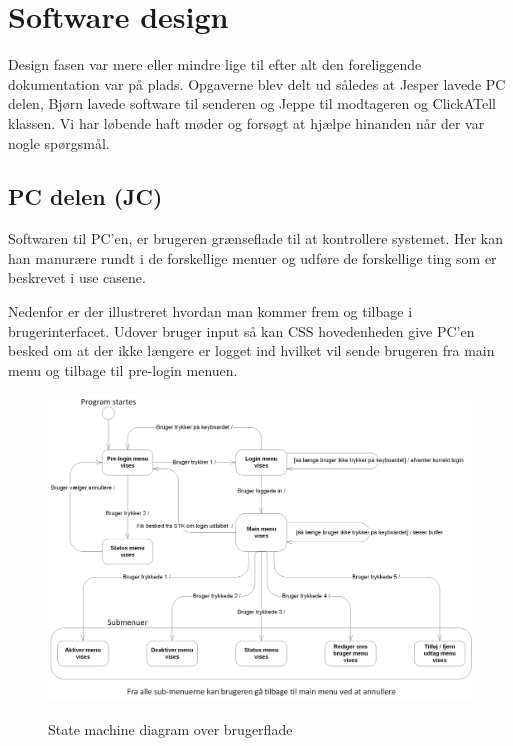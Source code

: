 \clearpage

\section{Software design}

Design fasen var mere eller mindre lige til efter alt den foreliggende dokumentation var på plads. Opgaverne blev delt ud således at Jesper lavede PC delen, Bjørn lavede software til senderen og Jeppe til modtageren og ClickATell klassen. Vi har løbende haft møder og forsøgt at hjælpe hinanden når der var nogle spørgsmål.

\subsection{PC delen (JC)}

Softwaren til PC'en, er brugeren grænseflade til at kontrollere systemet. Her kan han manurære rundt i de forskellige menuer og udføre de forskellige ting som er beskrevet i use casene.

Nedenfor er der illustreret hvordan man kommer frem og tilbage i brugerinterfacet. Udover bruger input så kan CSS hovedenheden give PC'en besked om at der ikke længere er logget ind hvilket vil sende brugeren fra main menu og tilbage til pre-login menuen.

\begin{figure}[htbp] \centering
{\includegraphics[width=\textwidth]{billeder/uml/state_machine_main}}
\caption{State machine diagram over brugerflade}
\label{lab:State machine diagram over brugerflade}
\end{figure}